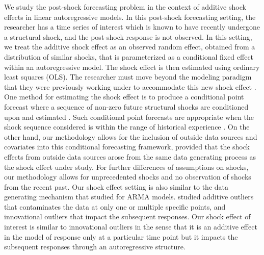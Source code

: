 \documentclass[11pt,3p,review,authoryear]{elsarticle}
\theoremstyle{definition}
\begin{document}
We study the post-shock forecasting problem in the context of additive shock effects in linear autoregressive models. In this post-shock forecasting setting, the researcher has a time series of interest which is known to have recently undergone a structural shock, and the post-shock response is not observed. In this setting, we treat the additive shock effect as an observed random effect, obtained from a distribution of similar shocks, that is parameterized as a conditional fixed effect within an autoregressive model. The shock effect is then estimated using ordinary least squares (OLS). The researcher must move beyond the modeling paradigm that they were previously working under to accommodate this new shock effect \citep{monti2008forecast, svensson2005monetary}. One method for estimating the shock effect is to produce a conditional point forecast where a sequence of non-zero future structural shocks are conditioned upon and estimated \citep{baumeister2014real}. Such conditional point forecasts are appropriate when the shock sequence considered is within the range of historical experience \citep{kilian2017structural}. On the other hand, our methodology allows for the inclusion of outside data sources and covariates into this conditional forecasting framework, provided that the shock effects from outside data sources arose from the same data generating process as the shock effect under study. For further differences of assumptions on shocks, our methodology allows for unprecedented shocks and no observation of shocks from the recent past. Our shock effect setting is also similar to the data generating mechanism that  \cite{tsay1986time} studied for ARMA models. \cite{tsay1986time} studied additive outliers that contaminates the data at only one or multiple specific points, and innovational outliers that impact the subsequent responses. Our shock effect of interest is similar to innovational  outliers  in the sense that it is an additive effect in the model of response only at a particular time point but it impacts the subsequent responses through an autoregressive structure.
\end{document}
